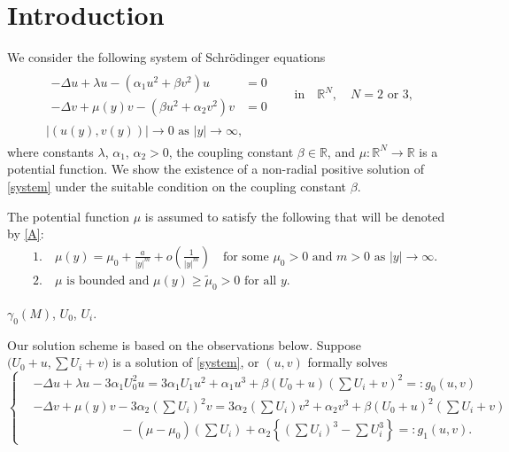 \documentclass[a4paper,11pt]{article}
\def\blue{\color{blue}}
\def\blue{\color{blue}}
\numberwithin{step}{dummy}
\begin{document}
\section{Introduction} \label{sec:intro}

\newpage

We consider the following system of Schr\"odinger equations 
\begin{align}\label{system}
 \begin{aligned}
 \begin{aligned}
 -\Delta u + \lambda u - \left(\alpha_1 u^2 + \beta v^2\right) u&= 0 \\
 -\Delta v + \mu(y) v - \left(\beta u^2 + \alpha_2 v^2\right) v&= 0
 \end{aligned} \quad &\text{in} \quad \mathbb{R}^N, \quad \text{$N=2$ or $3$},\\
 \text{$\big|(u(y),v(y))\big| \rightarrow 0$ as $|y| \rightarrow \infty$},&
 \end{aligned}
\end{align}
where constants $\lambda$, $\alpha_1$, $\alpha_2>0$, the coupling constant $\beta \in \mathbb{R}$, and $\mu: \mathbb{R}^N \rightarrow \mathbb{R}$ is a potential function. We show the existence of a non-radial {\blue positive} solution of \eqref{system} under the suitable condition on the coupling constant $\beta$. 

The potential function $\mu$ is assumed to satisfy the following that will be denoted by \eqref{A}:
\begin{equation}\tag{$A$}\label{A}
 \begin{aligned}
  &1. \quad \mu(y) = \mu_0 + \frac{a}{|y|^m} + o\left(\frac{1}{|y|^m}\right) \quad \text{for some $\mu_0>0$ and $m>0$ as $|y| \rightarrow \infty$.}\\
  &2. \quad \text{$\mu$ is bounded and $\mu(y)\ge \tilde{\mu}_0 > 0$ for all $y$.}
 \end{aligned}
\end{equation}

{\blue $\gamma_0(M)$, $U_0$, $U_i$.}

Our solution scheme is based on the observations below. Suppose $\big(U_0 +u, \sum U_i + v\big)$ is a solution of \eqref{system}, or $(u,v)$ formally solves
\begin{equation*}
 \left\{
 \begin{aligned}
 &-\Delta u + \lambda u - 3\alpha_1U_0^2 u = 3\alpha_1U_1 u^2 + \alpha_1u^3 + \beta(U_0+u)\left(\sum U_i +v\right)^2=:g_0(u,v)\\
 &-\Delta v + \mu(y) v - 3\alpha_2\left(\sum U_i\right)^2 v = 3\alpha_2\left(\sum U_i\right)v^2 + \alpha_2v^3 + \beta\left(U_0 +u\right)^2\left(\sum U_i +v\right)  \\
 & \quad \quad \quad \quad \quad \quad \quad - (\mu-\mu_0)\left(\sum U_i\right)+ \alpha_2\left\{ \left(\sum U_i\right)^3 - \sum U_i^3 \right\} =:g_1(u,v).
 \end{aligned}
 \right.
\end{equation*}
\end{document}
